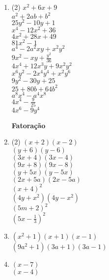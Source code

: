     \begin{enumerate}
        \item \begin{tasks}(2)
		\task $ x^2 + 6x + 9 $ \\[-0.25cm]
		\task $ a^2 + 2ab + b^2 $ \\[-0.25cm]
		\task $ 25y^2 - 10y + 1$ \\[-0.25cm]
		\task $ x^4 - 12x^2 + 36 $ \\[-0.25cm]
		\task $ 4x^2 + 28x + 49 $ \\[-0.25cm]
		\task $ 81x^2 - 1 $ \\[-0.25cm]
		\task $ a^4 - 2a^2xy + x^2y^2 $ \\[-0.25cm]
		\task $ 9x^2 - xy + \frac{y^2}{36} $ \\[-0.25cm]
		\task $ 4x^4 +12x^3y + 9x^2y^2 $ \\[-0.25cm]
		\task $ x^6y^2 - 2x^4y^4 + x^2y^6 $ \\[-0.25cm]
		\task $ 9y^2 - 30y + 25 $ \\[-0.25cm]
		\task $ 25 + 80b + 64b^2 $ \\[-0.25cm]
		\task $ a^8x^4 - a^4x^8 $ \\[-0.25cm]
		\task $ 4x^4 - \frac{9}{25} $ \\[-0.25cm]
		\task $ 4x^6 - 9y^4 $ \\
	\end{tasks}
    \noindent
	\hspace{-1.1cm} \textbf{Fatoração}
		\item 
        \begin{tasks}(2)
			\task $ (x+2)(x-2)$ \\[-0.25cm]
			\task $ (y+6)(y-6)$ \\[-0.25cm]
			\task $ (3x+4)(3x-4)$ \\[-0.25cm]
			\task $ (9x+8)(9x-8)$ \\[-0.25cm]
			\task $ (y+5x)(y-5x)$ \\[-0.25cm]
			\task $ (2x+5a)(2x-5a)$ \\[-0.25cm]
			\task $ (x+4)^2$ \\[-0.25cm]
			\task $ (4y + x^2)(4y - x^2)$ \\[-0.25cm]
			\task $ (5m + 2)^2$ \\[-0.25cm]
			\task $ (5x - \frac{1}{3})^2$
		\end{tasks}
  
		\item
		\begin{tasks}
			\task $ (x^2 + 1)(x + 1)(x - 1)$ \\[-0.25cm]
			\task $ (9a^2 + 1)(3a + 1)(3a - 1)$
		\end{tasks}
  
		\item
		\begin{tasks}
			\task $ (x - 7)$ \\[-0.25cm]
			\task $ (x - 4)$
		\end{tasks}
\end{enumerate}